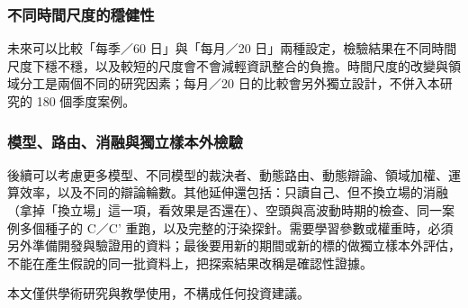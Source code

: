 \subsubsection{不同時間尺度的穩健性}

未來可以比較「每季／60 日」與「每月／20 日」兩種設定，檢驗結果在不同時間尺度下穩不穩，以及較短的尺度會不會減輕資訊整合的負擔。時間尺度的改變與領域分工是兩個不同的研究因素；每月／20 日的比較會另外獨立設計，不併入本研究的 180 個季度案例。

\subsubsection{模型、路由、消融與獨立樣本外檢驗}

後續可以考慮更多模型、不同模型的裁決者、動態路由、動態辯論、領域加權、運算效率，以及不同的辯論輪數。其他延伸還包括：只讀自己、但不換立場的消融（拿掉「換立場」這一項，看效果是否還在）、空頭與高波動時期的檢查、同一案例多個種子的 C／C' 重跑，以及完整的汙染探針。需要學習參數或權重時，必須另外準備開發與驗證用的資料；最後要用新的期間或新的標的做獨立樣本外評估，不能在產生假說的同一批資料上，把探索結果改稱是確認性證據。

\clearpage
{}



\vspace{0.3cm}
\noindent\small 本文僅供學術研究與教學使用，不構成任何投資建議。

